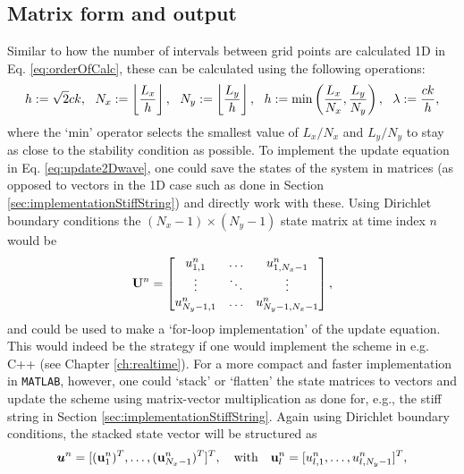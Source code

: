 \subsection{Matrix form and output}\label{sec:2DwaveImplementation}
Similar to how the number of intervals between grid points are calculated 1D in Eq. \eqref{eq:orderOfCalc}, these can be calculated using the following operations:
\begin{equation}\label{eq:orderOfCalc2D}
    h := \sqrt{2} ck, \ \ N_x := \floor[\frac{L_x}{h}], \ \  N_y := \floor[\frac{L_y}{h}], \ \  h := \text{min}\left(\frac{L_x}{N_x}, \frac{L_y}{N_y}\right), \ \  \lambda := \frac{ck}{h},
\end{equation}
where the `$\text{min}$' operator selects the smallest value of $L_x/N_x$ and $L_y/N_y$ to stay as close to the stability condition as possible. 
To implement the update equation in Eq. \eqref{eq:update2Dwave}, one could save the states of the system in matrices (as opposed to vectors in the 1D case such as done in Section \ref{sec:implementationStiffString}) and directly work with these. Using Dirichlet boundary conditions the $(N_x-1) \times (N_y-1)$ state matrix at time index $n$ would be
\begin{equation}
    \mathbf{U}^n = \begin{bmatrix}
        u^n_{1, 1} & \hdots & u^n_{1, N_x-1}\\
        \vdots & \ddots & \vdots\\
        u^n_{N_y-1, 1} & \hdots & u^n_{N_y-1, N_x-1}
    \end{bmatrix},
\end{equation}
and could be used to make a `for-loop implementation' of the update equation. This would indeed be the strategy if one would implement the scheme in e.g. C++ (see Chapter \ref{ch:realtime}). For a more compact and faster implementation in \texttt{MATLAB}, however, one could `stack' or `flatten' the state matrices to vectors and update the scheme using matrix-vector multiplication as done for, e.g., the stiff string in Section \ref{sec:implementationStiffString}. Again using Dirichlet boundary conditions, the stacked state vector will be structured as
\begin{equation}\label{eq:stackedState}
    \boldsymbol{u}^n = [(\mathbf{u}_{1}^n)^T, \hdots, (\mathbf{u}_{N_x-1}^n)^T]^T, \quad \text{with} \quad \mathbf{u}^n_l = [u^n_{l, 1}, \hdots, u^n_{l, N_y-1}]^T,
\end{equation}
